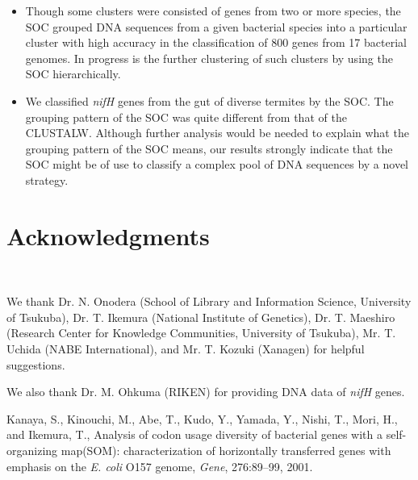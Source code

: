 \documentclass[portrait,a0]{a0poster}
\begin{document}
\begin{multicols}{3}
\begin{itemize}
\item Though some clusters were consisted of genes from two or more species, the SOC grouped DNA sequences from a given bacterial species into a particular cluster with high accuracy in the classification of 800 genes from 17 bacterial genomes.
In progress is the further clustering of such clusters by using the SOC hierarchically.
\item We classified \textit{nifH} genes from the gut of diverse termites by the SOC. The grouping pattern of the SOC was quite different from that of the CLUSTALW. 
Although further analysis would be needed to explain what the grouping pattern of the SOC means, 
our results strongly indicate that the SOC might be of use to classify a complex pool of DNA sequences by a novel strategy.
\end{itemize}

\vspace{5mm}


\section*{Acknowledgments} \linespread{1.4}\fontsize{25}{20}\selectfont
\

\vspace{-40pt} We thank Dr. N. Onodera (School of Library and Information Science, University of Tsukuba),
Dr. T. Ikemura (National Institute of Genetics),
Dr. T. Maeshiro (Research Center for Knowledge Communities, University of Tsukuba),
Mr. T. Uchida (NABE International),
and Mr. T. Kozuki (Xanagen) 
for helpful suggestions.

We also thank Dr. M. Ohkuma (RIKEN) for providing DNA data of \textit{nifH} genes. \normalfont

\vspace{-6mm}
\begin{thebibliography}{10}

Kanaya, S., Kinouchi, M., Abe, T., Kudo, Y., Yamada, Y., Nishi, T., Mori, H., and Ikemura, T.,
Analysis of codon usage diversity of bacterial genes with a self-organizing map(SOM): characterization of horizontally transferred genes with emphasis on the {\it E. coli} O157 genome,
{\em Gene}, 276:89--99, 2001.
%


\end{thebibliography}
\end{multicols}
\end{document}
